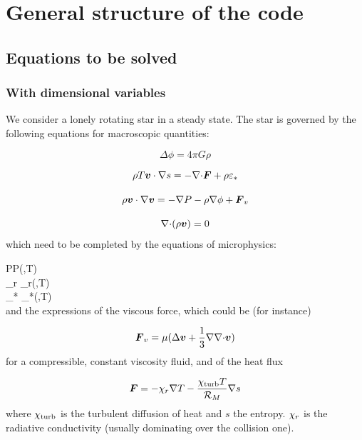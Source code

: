 \chapter{General structure of the code}


\section{Equations to be solved}

\subsection{With dimensional variables}

We consider a lonely rotating star in a steady state. The star is
governed by the following equations for macroscopic quantities:

\begin{equation} \Delta\phi = 4\pi G\rho\end{equation}

\begin{equation} \rho T \vv\cdot\nabla s = -\Div\vF + \rho\eps_*\end{equation}

\begin{equation} \rho \vv\cdot\na\vv = -\na P -\rho\na\phi+\vF_v\end{equation}

\begin{equation} \Div(\rho\vv) =0\end{equation}
which need to be completed by the equations of microphysics:

\greq
P\equiv P(\rho,T)\\
\khi_r \equiv \khi_r(\rho,T)\\
\eps_* \equiv \eps_*(\rho,T)\\
\egreq
and the expressions of the viscous force, which could be (for instance)

\begin{equation} \vF_v = \mu(\Delta\vv + \frac{1}{3}\na\Div\vv)\end{equation}
for a compressible, constant viscosity fluid, and of the heat flux

\begin{equation} \vF = -\khi_r\na T -\frac{\khi_{\rm turb}T}{{\cal R}_M}\na s\end{equation}
where $\chi_{\rm turb}$ is the turbulent diffusion of heat and $s$ the
entropy. $\chi_r$ is the radiative conductivity (usually dominating over
the collision one).

